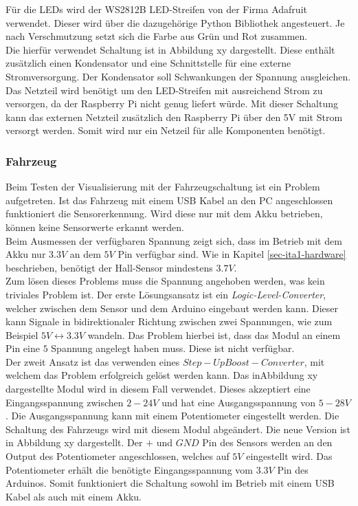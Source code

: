 \documentclass[.../Dokumentation.tex]{subfiles}
\begin{document}
    Für die LEDs wird der WS2812B LED-Streifen von der Firma Adafruit verwendet. Dieser wird über die dazugehörige Python Bibliothek angesteuert. Je nach Verschmutzung setzt sich die Farbe aus Grün und Rot zusammen.\\
    Die hierfür verwendet Schaltung ist in Abbildung xy dargestellt. 
   	Diese enthält zusätzlich einen Kondensator und eine Schnittstelle für eine externe Stromversorgung. Der Kondensator soll Schwankungen der Spannung ausgleichen. Das Netzteil wird benötigt um den LED-Streifen mit ausreichend Strom zu versorgen, da der Raspberry Pi nicht genug liefert würde. Mit dieser Schaltung kann das externen Netzteil zusätzlich den Raspberry Pi über den 5V mit Strom versorgt werden. Somit wird nur ein Netzeil für alle Komponenten  benötigt.
   	
   	\subsubsection*{Fahrzeug}
   	Beim Testen der Visualisierung mit der Fahrzeugschaltung ist ein Problem aufgetreten. Ist das Fahrzeug mit einem USB Kabel an den PC angeschlossen funktioniert die Sensorerkennung. Wird diese nur mit dem Akku betrieben, können keine Sensorwerte erkannt werden.\\
   	Beim Ausmessen der verfügbaren Spannung zeigt sich, dass im Betrieb mit dem Akku nur $3.3V$ an dem $5V$ Pin verfügbar sind. Wie in Kapitel \ref{sec-ita1-hardware} beschrieben, benötigt der Hall-Sensor mindestens $3.7V$.\\
   	Zum lösen dieses Problems muss die Spannung angehoben werden, was kein triviales Problem ist. Der erste Lösungsansatz ist ein \emph{Logic-Level-Converter}, welcher zwischen dem Sensor und dem Arduino eingebaut werden kann. Dieser kann Signale in bidirektionaler Richtung zwischen zwei Spannungen, wie zum Beispiel $5V \longleftrightarrow 3.3V$ wandeln. Das Problem hierbei ist, dass das Modul an einem Pin eine $5$ Spannung angelegt haben muss. Diese ist nicht verfügbar.\\
   	Der zweit Ansatz ist das verwenden eines $Step-Up Boost-Converter$, mit welchem das Problem erfolgreich gelöst werden kann. Das inAbbildung xy dargestellte Modul wird in diesem Fall verwendet.   	%
   	Dieses akzeptiert eine Eingangsspannung zwischen $2-24V$ und hat eine Ausgangsspannung von $5-28V$. Die Ausgangsspannung kann mit einem Potentiometer eingestellt werden. Die Schaltung des Fahrzeugs wird mit diesem Modul abgeändert. Die neue Version ist in Abbildung xy dargestellt. %
   	Der $+$ und $GND$ Pin des Sensors werden an den Output des Potentiometer angeschlossen, welches auf $5V$ eingestellt wird. Das Potentiometer erhält die benötigte Eingangsspannung vom $3.3V$ Pin des Arduinos. Somit funktioniert die Schaltung sowohl im Betrieb mit einem USB Kabel als auch mit einem Akku. 
    
    
\end{document}
